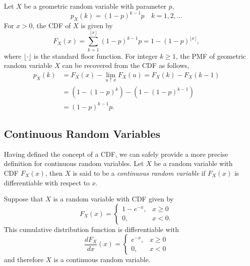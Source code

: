 \begin{example}
Let $X$ be a geometric random variable with parameter $p$,
\begin{equation*}
p_X (k) = (1 - p)^{k-1} p \quad k = 1, 2, \ldots 
\end{equation*}
For $x > 0$, the CDF of $X$ is given by
\begin{equation*}
F_X (x) = \sum_{k = 1}^{\lfloor x \rfloor} (1 - p)^{k-1} p
= 1 - (1 - p)^{\lfloor x \rfloor} ,
\end{equation*}
where $\lfloor \cdot \rfloor$ is the standard floor function.
For integer $k \geq 1$, the PMF of geometric random variable $X$ can be recovered from the CDF as follows,
\begin{equation*}
\begin{split}
p_X (k) &= F_X (x) - \lim_{u \uparrow x} F_X (u) = F_X (k) - F_X (k-1) \\
&= \left( 1 - (1-p)^k \right) - \left( 1 - (1-p)^{k-1} \right) \\
&= (1 - p)^{k-1} p .
\end{split}
\end{equation*}
\end{example}


\subsection{Continuous Random Variables}

Having defined the concept of a CDF, we can safely provide a more precise definition for continuous random variables.
Let $X$ be a random variable with CDF $F_X (x)$, then $X$ is said to be a \emph{continuous random variable} if $F_X (x)$ is differentiable with respect to $x$. 

\begin{example}
Suppose that $X$ is a random variable with CDF given by
\begin{equation*}
F_X(x) = \begin{cases} 1 - e^{-x}, & x \geq 0 \\
0, & x < 0 . \end{cases}
\end{equation*}
This cumulative distribution function is differentiable with
\begin{equation*}
\frac{dF_X}{dx}(x)
= \begin{cases} e^{-x}, & x \geq 0 \\
0, & x < 0 \end{cases}
\end{equation*}
and therefore $X$ is a continuous random variable.
\end{example}


